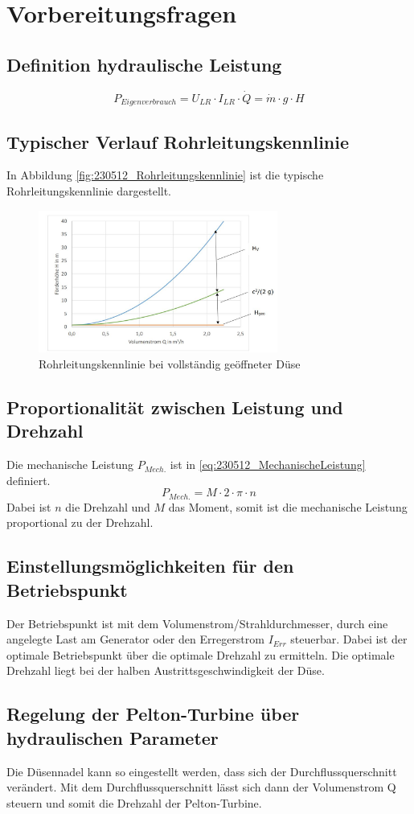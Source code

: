 \section{Vorbereitungsfragen}
\label{sec:Vorbereitungsfragen}
\subsection{Definition hydraulische Leistung}
%
\begin{equation}
	P_{ Eigenverbrauch }= U_{ LR} \cdot I_{ LR }\cdot \dot Q = \dot m \cdot g \cdot H
\label{eq:2}
\end{equation}
%
\subsection{Typischer Verlauf Rohrleitungskennlinie}
In Abbildung \autoref{fig:230512_Rohrleitungskennlinie} ist die typische Rohrleitungskennlinie dargestellt.
%
\begin{figure}[!ht]
		\centering
		\includegraphics[width=0.7\textwidth]{Abbildungen/Rohrleitungskennlinie}
		\caption{Rohrleitungskennlinie bei vollständig geöffneter Düse}
		\label{fig:230512_Rohrleitungskennlinie}
\end{figure}
%
\subsection{Proportionalität zwischen Leistung und Drehzahl}
\label{subsec:P_mech-n}
Die mechanische Leistung $P_{Mech.}$ ist in \autoref{eq:230512_MechanischeLeistung} definiert.
%
\begin{equation}
	P_{Mech.}= M \cdot 2 \cdot \pi \cdot n
\label{eq:230512_MechanischeLeistung}
\end{equation}
%
Dabei ist $n$ die Drehzahl und $M$ das Moment, somit ist die mechanische Leistung proportional zu der Drehzahl.
\subsection{Einstellungsmöglichkeiten für den Betriebspunkt}
Der Betriebspunkt ist mit dem Volumenstrom/Strahldurchmesser, durch eine angelegte Last am Generator oder den Erregerstrom $I_{Err}$ steuerbar. Dabei ist der optimale Betriebspunkt über die optimale Drehzahl zu ermitteln. Die optimale Drehzahl liegt bei der halben Austrittsgeschwindigkeit der Düse.

\subsection{Regelung der Pelton-Turbine über hydraulischen Parameter}
Die Düsennadel kann so eingestellt werden, dass sich der Durchflussquerschnitt verändert. Mit dem Durchflussquerschnitt lässt sich dann der Volumenstrom Q steuern und somit die Drehzahl der Pelton-Turbine.